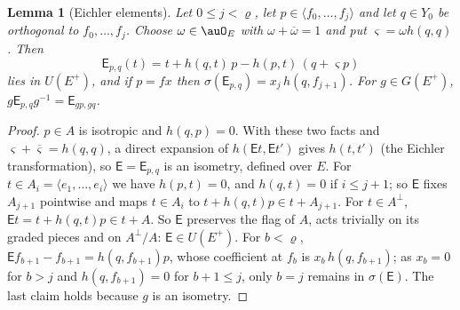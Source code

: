 \documentclass[10pt]{amsart}
\newtheorem{lemma}[theorem]{Lemma}
\theoremstyle{definition}
\theoremstyle{remark}
\providecommand{\aubar}[1]{\overline{#1}}
\begin{document}
\begin{lemma}[Eichler elements]\label{ppi:eichler}
Let $0\le j<\varrho$, let $p\in\langle f_0,\dots,f_j\rangle$ and let $q\in Y_0$ be orthogonal to
$f_0,\dots,f_j$. Choose $\omega\in\auO_E$ with $\omega+\aubar\omega=1$ and put $\varsigma=\omega h(q,q)$.
Then
\[
\mathsf E_{p,q}(t)=t+h(q,t)\,p-h(p,t)\,(q+\varsigma p)
\]
lies in $U(E^+)$, and if $p=fx$ then $\sigma(\mathsf E_{p,q})=x_j\,h(q,f_{j+1})$. For $g\in G(E^+)$,
$g\mathsf E_{p,q}g^{-1}=\mathsf E_{gp,gq}$.
\end{lemma}
\begin{proof}
$p\in A$ is isotropic and $h(q,p)=0$. With these two facts and $\varsigma+\aubar\varsigma=h(q,q)$, a
direct expansion of $h(\mathsf E t,\mathsf Et')$ gives $h(t,t')$ (the Eichler transformation), so
$\mathsf E=\mathsf E_{p,q}$ is an isometry, defined over $E$. For $t\in A_i=\langle e_1,\dots,e_i
\rangle$ we have $h(p,t)=0$, and $h(q,t)=0$ if $i\le j+1$; so $\mathsf E$ fixes $A_{j+1}$ pointwise
and maps $t\in A_i$ to $t+h(q,t)p\in t+A_{j+1}$. For $t\in A^\perp$, $\mathsf Et=t+h(q,t)p\in t+A$.
So $\mathsf E$ preserves the flag of $A$, acts trivially on its graded pieces and on $A^\perp/A$:
$\mathsf E\in U(E^+)$. For $b<\varrho$, $\mathsf Ef_{b+1}-f_{b+1}=h(q,f_{b+1})p$, whose coefficient
at $f_b$ is $x_b\,h(q,f_{b+1})$; as $x_b=0$ for $b>j$ and $h(q,f_{b+1})=0$ for $b+1\le j$, only
$b=j$ remains in $\sigma(\mathsf E)$. The last claim holds because $g$ is an isometry.
\end{proof}
\end{document}
